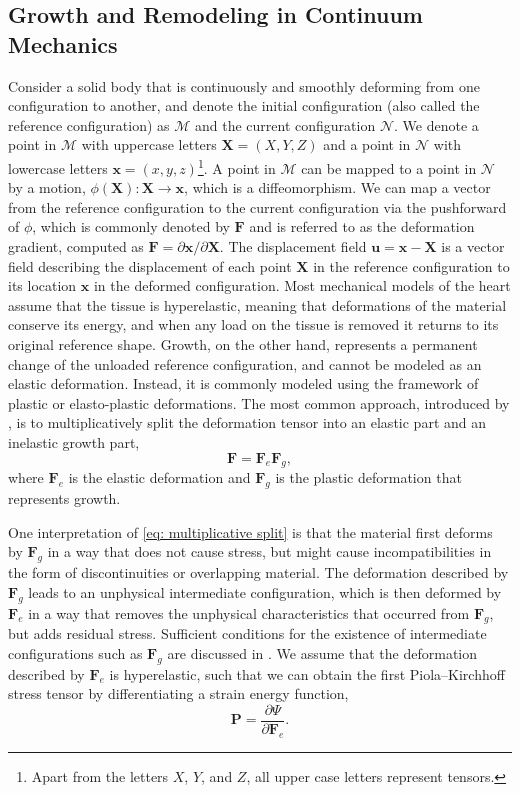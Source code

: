 \subsection{Growth and Remodeling in Continuum Mechanics}
Consider a solid body that is continuously and smoothly deforming from one configuration to another, and denote the initial configuration (also called the reference configuration) as $\mathcal{M}$ and the current configuration $\mathcal{N}$. We denote a point in $\mathcal{M}$ with uppercase letters $\mathbf{X} = (X, Y, Z)$ and a point in $\mathcal{N}$ with lowercase letters $\mathbf{x} = (x, y, z)$\footnote{Apart from the letters $X$, $Y$, and $Z$, all upper case letters represent tensors.}. A point in $\mathcal{M}$ can be mapped to a point in $\mathcal{N}$ by a motion, $\phi(\mathbf{X}): \mathbf{X} \rightarrow \mathbf{x}$, which is a diffeomorphism. We can map a vector from the reference configuration to the current configuration via the pushforward of $\phi$, which is commonly denoted by $\mathbf{F}$ and is referred to as the deformation gradient, computed as $\mathbf{F} = \partial\mathbf{x}/\partial\mathbf{X}$. The displacement field $\mathbf{u} = \mathbf{x} - \mathbf{X}$ is a vector field describing the displacement of each point $\mathbf{X}$ in the reference configuration to its location $\mathbf{x}$ in the deformed configuration. 
Most mechanical models of the heart assume that the tissue is hyperelastic, meaning that deformations of the material conserve its energy, and when any load on the tissue is removed it returns to its original reference shape. Growth, on the other hand, represents a permanent change of the unloaded reference configuration, and cannot be modeled as an elastic deformation. Instead, it is commonly modeled using the framework of plastic or elasto-plastic deformations. The most common approach, introduced by \citep{Rodriguez1994}, is to multiplicatively split the deformation tensor into an elastic part and an inelastic growth part, 
\begin{equation}
\label{eq: multiplicative split}
    \mathbf{F} = \mathbf{F}_e\mathbf{F}_g,
\end{equation}
where $\mathbf{F}_e$ is the elastic deformation and $\mathbf{F}_g$ is the plastic deformation that represents growth. 

One interpretation of \ref{eq: multiplicative split} is that the material first deforms by $\mathbf{F}_g$ in a way that does not cause stress, but might cause incompatibilities in the form of discontinuities or overlapping material. The deformation described by $\mathbf{F}_g$ leads to an unphysical intermediate configuration, which is then deformed by $\mathbf{F}_e$ in a way that removes the unphysical characteristics that occurred from $\mathbf{F}_g$, but adds residual stress. Sufficient conditions for the existence of intermediate configurations such as $\mathbf{F}_g$ are discussed in \citep{Goodbrake2021}. We assume that the deformation described by $\mathbf{F}_e$ is hyperelastic, such that we can obtain the first Piola–Kirchhoff stress tensor by differentiating a strain energy function,
\begin{equation}
\label{eq: stress}
    \mathbf{P} = \frac{\partial\Psi}{\partial \mathbf{F}_e}.
\end{equation}

